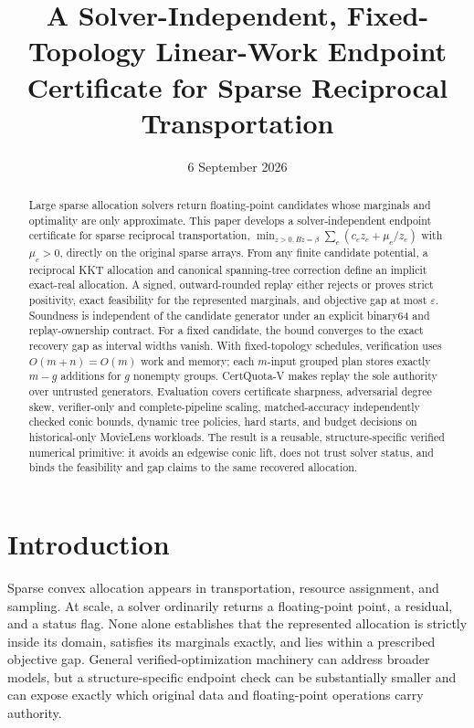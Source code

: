 \documentclass[smallextended,envcountsect]{svjour3}
\title{A Solver-Independent, Fixed-Topology Linear-Work Endpoint Certificate
for Sparse Reciprocal Transportation}
\author{\PaperAuthorList}
\institute{\PaperInstitute}
\date{6 September 2026}
\begin{document}
\maketitle

\begin{abstract}
Large sparse allocation solvers return floating-point candidates whose
marginals and optimality are only approximate.  This paper develops a
solver-independent endpoint certificate for sparse reciprocal transportation,
$\min_{z>0,Bz=\beta}\sum_e(c_ez_e+\mu_e/z_e)$ with $\mu_e>0$, directly on the
original sparse arrays.  From any finite candidate potential, a reciprocal KKT
allocation and canonical spanning-tree correction define an implicit exact-real
allocation.  A signed, outward-rounded replay either rejects or proves strict
positivity, exact feasibility for the represented marginals, and objective gap at most
$\varepsilon$.  Soundness is independent of the candidate generator under an
explicit binary64 and replay-ownership contract.  For a fixed candidate, the
bound converges to the exact recovery gap as interval widths vanish.  With
fixed-topology schedules, verification uses $O(m+n)=O(m)$ work and memory; each
$m$-input grouped plan stores exactly $m-g$ additions for $g$ nonempty groups.
CertQuota-V makes replay the sole authority over untrusted generators.
Evaluation covers certificate sharpness, adversarial degree skew, verifier-only
and complete-pipeline scaling, matched-accuracy independently checked conic
bounds, dynamic tree policies, hard starts, and budget decisions on
historical-only MovieLens workloads.
The result is a reusable, structure-specific verified numerical primitive: it
avoids an edgewise conic lift, does not trust solver status, and binds the
feasibility and gap claims to the same recovered allocation.
\end{abstract}
\section{Introduction}

Sparse convex allocation appears in transportation, resource assignment, and
sampling.  At scale, a solver ordinarily returns a floating-point point, a
residual, and a status flag.  None alone establishes that the represented
allocation is strictly inside its domain, satisfies its marginals exactly, and
lies within a prescribed objective gap.  General verified-optimization
machinery can address broader models, but a structure-specific endpoint check
can be substantially smaller and can expose exactly which original data and
floating-point operations carry authority.
\end{document}

